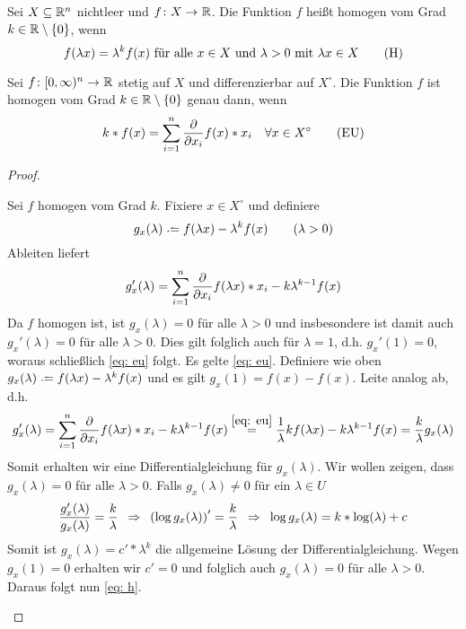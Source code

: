 \begin{*definition}
	Sei $X \subseteq \mathbb{R}^n$ nichtleer und $\abb{f}{X}{\R}$. Die Funktion $f$ heißt homogen vom Grad $k \in \mathbb{R}\setminus\left\{ 0 \right\}$, wenn
	\begin{equation*}
		f(\lambda x) = \lambda^k f(x) \text{ für alle } x \in X \text{ und } \lambda > 0  \text{ mit } \lambda x \in X
		\tag{H} \label{eq: h}
	\end{equation*}
\end{*definition}

\begin{theorem}
	Sei $\abb{f}{[0,\infty)^n}{\R}$ stetig auf $X$ und differenzierbar auf $X^\circ$. Die Funktion $f$ ist homogen vom Grad $k \in \mathbb{R}\setminus\left\{ 0 \right\}$ genau dann, wenn
	\begin{equation*}
		k * f(x) = \sum_{i = 1}^n \frac{\partial}{\partial x_i } f(x) * x_i \quad \forall x \in X^\circ
		\tag{EU} \label{eq: eu}
	\end{equation*}
\end{theorem}
\begin{proof}
	\begin{equivalence}
		\hinrichtung Sei $f$ homogen vom Grad $k$. Fixiere $x \in X^\circ$ und definiere
		\begin{equation*}
			g_x(\lambda) \defeq f(\lambda x) - \lambda^k f(x) \qquad (\lambda > 0)
		\end{equation*}
		Ableiten liefert
		\begin{equation*}
			g_x'(\lambda) = \sum_{i = 1}^n \frac{\partial}{\partial x_i } f(\lambda x) * x_i - k \lambda^{k-1} f(x)
		\end{equation*}
		Da $f$ homogen ist, ist $g_x(\lambda) = 0$ für alle $\lambda > 0$ und insbesondere ist damit auch $g_x'(\lambda) = 0$ für alle $\lambda > 0$. Dies gilt folglich auch für $\lambda = 1$, d.h. $g_x'(1) = 0$, woraus schließlich \eqref{eq: eu} folgt.
		\rueckrichtung Es gelte \eqref{eq: eu}. Definiere wie oben $g_x(\lambda) \defeq f(\lambda x) - \lambda^k f(x)$ und es gilt $g_x(1) = f(x) - f(x)$. Leite analog ab, d.h. 
		\begin{equation*}
			g_x'(\lambda) = \sum_{i = 1}^n \frac{\partial}{\partial x_i } f(\lambda x) * x_i - k \lambda^{k-1} f(x) \overset{\eqref{eq: eu}}{=} \frac{1}{\lambda} k f(\lambda x) - k \lambda^{k-1} f(x) = \frac{k}{\lambda} g_x(\lambda)
		\end{equation*}
		Somit erhalten wir eine Differentialgleichung für $g_x(\lambda)$. Wir wollen zeigen, dass $g_x(\lambda) = 0$ für alle $\lambda > 0$. Falls $g_x(\lambda) \neq 0$ für ein $\lambda \in U$
		\begin{equation*}
			\frac{g_x'(\lambda)}{g_x(\lambda)} = \frac{k}{\lambda} \enskip \Rightarrow \enskip \left( \log g_x(\lambda) \right)' = \frac{k}{\lambda} \enskip \Rightarrow \enskip\log g_x(\lambda) = k * \log(\lambda) + c
		\end{equation*}
		Somit ist $g_x(\lambda) = c' * \lambda^k$ die allgemeine Lösung der Differentialgleichung. Wegen $g_x(1) = 0$ erhalten wir $c' = 0$ und folglich auch $g_x(\lambda) = 0$ für alle $\lambda > 0$. Daraus folgt nun \eqref{eq: h}.
	\end{equivalence}
\end{proof}

